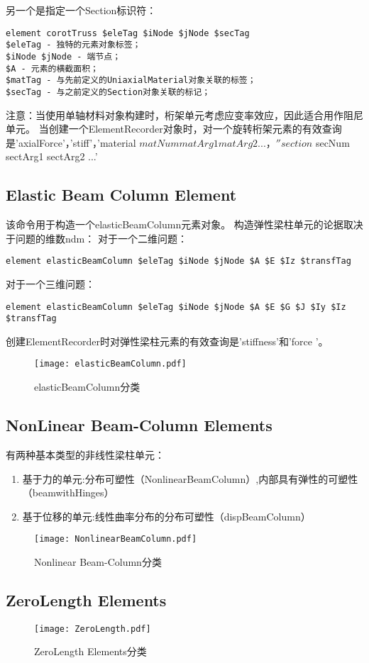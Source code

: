 \documentclass[lang=cn]{elegantpaper}
\begin{document}
另一个是指定一个Section标识符：
\begin{lstlisting}
element corotTruss $eleTag $iNode $jNode $secTag
$eleTag - 独特的元素对象标签；
$iNode $jNode - 端节点；
$A - 元素的横截面积；
$matTag - 与先前定义的UniaxialMaterial对象关联的标签；
$secTag - 与之前定义的Section对象关联的标记；
\end{lstlisting}



注意：当使用单轴材料对象构建时，桁架单元考虑应变率效应，因此适合用作阻尼单元。
当创建一个ElementRecorder对象时，对一个旋转桁架元素的有效查询是'axialForce'，'stiff'，'material $ matNum matArg1 matArg2 ...，''section $ secNum sectArg1 sectArg2 ...'
\subsection{Elastic Beam Column Element}
该命令用于构造一个elasticBeamColumn元素对象。 构造弹性梁柱单元的论据取决于问题的维数ndm：
对于一个二维问题：
\begin{lstlisting}
element elasticBeamColumn $eleTag $iNode $jNode $A $E $Iz $transfTag
\end{lstlisting}
对于一个三维问题：
\begin{lstlisting}
element elasticBeamColumn $eleTag $iNode $jNode $A $E $G $J $Iy $Iz $transfTag
\end{lstlisting}
创建ElementRecorder时对弹性梁柱元素的有效查询是'stiffness'和'force '。
\begin{figure}[H]		
	\centering
	\texttt{[image: elasticBeamColumn.pdf]}
	\caption{elasticBeamColumn分类}
	\label{tu9}
\end{figure}





\subsection{NonLinear Beam-Column Elements}
有两种基本类型的非线性梁柱单元：
\begin{enumerate}
	\item 基于力的单元:分布可塑性（NonlinearBeamColumn）,内部具有弹性的可塑性（beamwithHinges）
	\item 基于位移的单元:线性曲率分布的分布可塑性（dispBeamColumn）
\end{enumerate}
\begin{figure}[H]		
	\centering
	\texttt{[image: NonlinearBeamColumn.pdf]}
	\caption{Nonlinear Beam-Column分类}
	\label{tu10}
\end{figure}


\subsection{ZeroLength Elements}
\begin{figure}[H]		
	\centering
	\texttt{[image: ZeroLength.pdf]}
	\caption{ZeroLength Elements分类}
	\label{tu11}
\end{figure}
\end{document}
